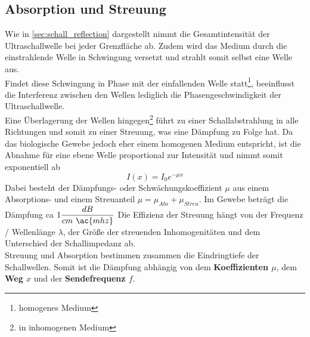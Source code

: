 \subsection{Absorption und Streuung}
Wie in \autoref{sec:schall_reflection} dargestellt nimmt die Gesamtintensität der Ultraschallwelle bei jeder Grenzfläche ab. Zudem wird das Medium durch die einstrahlende Welle in Schwingung versetzt und strahlt somit selbst eine Welle aus. \\
Findet diese Schwingung in Phase mit der einfallenden Welle statt\footnote{homogenes Medium}, beeinflusst die Interferenz zwischen den Wellen lediglich die Phasengeschwindigkeit der Ultraschallwelle.\\
Eine Überlagerung der Wellen hingegen\footnote{in inhomogenen Medium} führt zu einer Schallabstrahlung in alle Richtungen und somit zu einer Streuung, was eine Dämpfung zu Folge hat.\newline
Da das biologische Gewebe jedoch eher einem homogenen Medium entspricht, ist die Abnahme für eine ebene Welle proportional zur Intensität und nimmt somit exponentiell ab
\begin{equation}
I(x)=I_0e^{-\mu x}
\end{equation}
Dabei besteht der Dämpfungs- oder Schwächungskoeffizient $\mu$ aus einem Absorptions- und einem Streuanteil \(\mu = \mu_{Abs}+\mu_{Streu}\). Im Gewebe beträgt die Dämpfung \ac{ca} $1\dfrac{dB}{cm\ \ac{mhz}}$ 
Die Effizienz der Streuung hängt von der Frequenz / Wellenlänge $\lambda$, der Größe der streuenden Inhomogenitäten und dem Unterschied der Schallimpedanz ab. \\
Streuung und Absorption bestimmen zusammen die Eindringtiefe der Schallwellen.
Somit ist die Dämpfung abhängig von dem \textbf{Koeffizienten \(\mu\)}, dem \textbf{Weg \(x\)} und der \textbf{Sendefrequenz \(f\)}.
%
\cite{suter2006}\cite{suter2009}\cite{suter2010}
%
